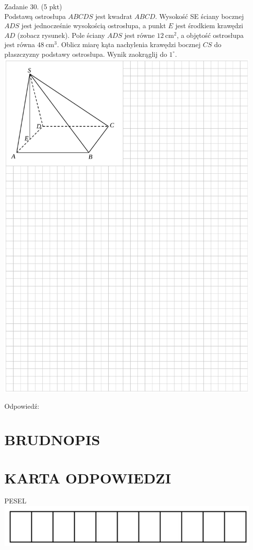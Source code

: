 \documentclass[10pt]{article}
\begin{document}
Zadanie 30. (5 pkt)\\
Podstawą ostrosłupa \(A B C D S\) jest kwadrat \(A B C D\). Wysokość SE ściany bocznej \(A D S\) jest jednocześnie wysokością ostrosłupa, a punkt \(E\) jest środkiem krawędzi \(A D\) (zobacz rysunek). Pole ściany \(A D S\) jest równe \(12 \mathrm{~cm}^{2}\), a objętość ostrosłupa jest równa \(48 \mathrm{~cm}^{3}\). Oblicz miarę kąta nachylenia krawędzi bocznej \(C S\) do płaszczyzny podstawy ostrosłupa. Wynik zaokrąglij do \(1^{\circ}\).\\
\includegraphics[max width=\textwidth, center]{2024_11_21_2c2c97b7feae6d70b078g-14}

Odpowiedź: \(\qquad\)

\section*{BRUDNOPIS}
\section*{KARTA ODPOWIEDZI}
PESEL\\
\includegraphics[max width=\textwidth, center]{2024_11_21_2c2c97b7feae6d70b078g-16(1)}
\end{document}
